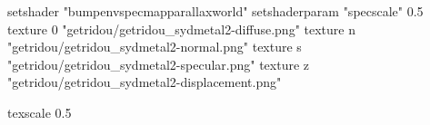 setshader "bumpenvspecmapparallaxworld"
setshaderparam "specscale" 0.5
texture 0 "getridou/getridou_sydmetal2-diffuse.png"
texture n "getridou/getridou_sydmetal2-normal.png"
texture s "getridou/getridou_sydmetal2-specular.png"
texture z "getridou/getridou_sydmetal2-displacement.png"

texscale 0.5
